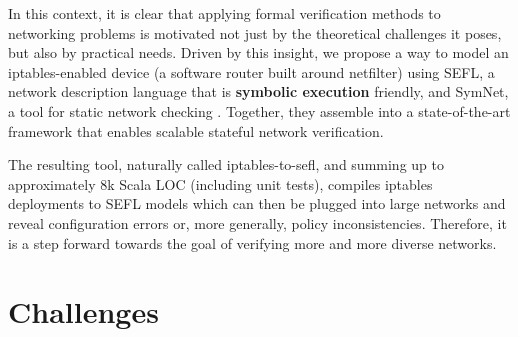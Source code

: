 In this context, it is clear that applying formal verification methods to
networking problems is motivated not just by the theoretical challenges it
poses, but also by practical needs.  Driven by this insight, we propose a way
to model an iptables-enabled device (a software router built around netfilter)
using SEFL, a network
description language that is \textbf{symbolic execution} friendly, and SymNet,
a tool for static network checking \cite{stoenescu2016symnet,
stoenescu2013symnet}.  Together, they assemble into a state-of-the-art
framework that enables scalable stateful network verification.

The resulting tool, naturally called iptables-to-sefl, and summing up to
approximately 8k Scala LOC (including unit tests), compiles iptables
deployments to SEFL models which can then be plugged into large networks and
reveal configuration errors or, more generally, policy inconsistencies.
Therefore, it is a step forward towards the goal of verifying more and more
diverse networks.

\section{Challenges}
